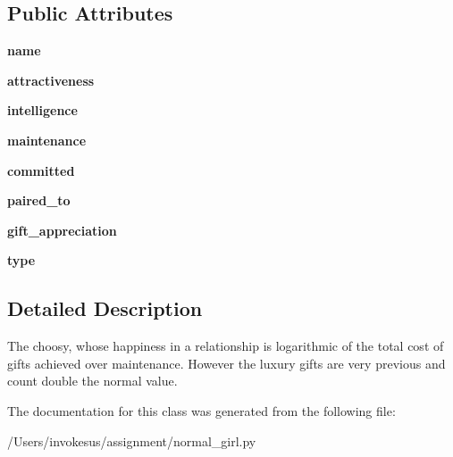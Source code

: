 \subsection*{Public Attributes}
\begin{DoxyCompactItemize}
\item 
\mbox{\label{classnormal__girl_1_1_normal___girl_ac6ce282217638dbd0e18294e8fd6ea87}} 
{\bfseries name}
\item 
\mbox{\label{classnormal__girl_1_1_normal___girl_a8124c0797d5bf37f820de629367a5ee6}} 
{\bfseries attractiveness}
\item 
\mbox{\label{classnormal__girl_1_1_normal___girl_a6e13ef914384e8b71ab9b1322d9a8674}} 
{\bfseries intelligence}
\item 
\mbox{\label{classnormal__girl_1_1_normal___girl_a1807ad41310412d615a5b9929132b181}} 
{\bfseries maintenance}
\item 
\mbox{\label{classnormal__girl_1_1_normal___girl_a5323e9a7a3dbe63723110d47cb975596}} 
{\bfseries committed}
\item 
\mbox{\label{classnormal__girl_1_1_normal___girl_a7fa753a9edfb1e92e23b5c664d08552b}} 
{\bfseries paired\+\_\+to}
\item 
\mbox{\label{classnormal__girl_1_1_normal___girl_a43fad908acb615885991aa3f76a3a8b4}} 
{\bfseries gift\+\_\+appreciation}
\item 
\mbox{\label{classnormal__girl_1_1_normal___girl_a2b09c350fa195f1532cff9689276e0a2}} 
{\bfseries type}
\end{DoxyCompactItemize}


\subsection{Detailed Description}
\begin{DoxyVerb}The choosy, whose happiness in a relationship is logarithmic of the total cost of gifts achieved over maintenance. However the luxury gifts are very previous and count double the normal value.
\end{DoxyVerb}
 

The documentation for this class was generated from the following file\+:\begin{DoxyCompactItemize}
\item 
/\+Users/invokesus/assignment/normal\+\_\+girl.\+py\end{DoxyCompactItemize}
